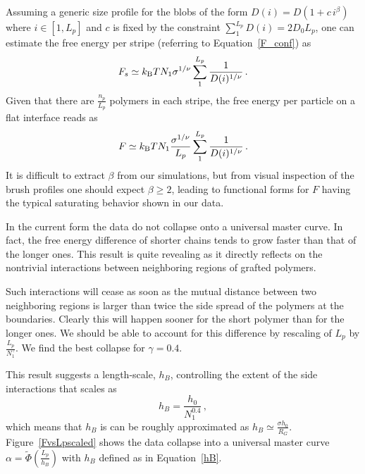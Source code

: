 Assuming a generic size profile for the blobs of the form $D(i)=D(1+ c \,i^{\beta})$ where $i\in [1,L_p]$ and
 $c$ is fixed by the constraint $\sum_1^{L_p} D(i)=2D_0L_p$, 
one can estimate the free energy per stripe (referring to Equation~\ref{F_conf}) as 
\begin{equation}
	F_s\simeq k_{\rm B}T N_1 \sigma^{1/\nu} \sum_1^{L_p}  \frac{1}{D(i)^{1/\nu}} \,.
\end{equation}
Given that there are $\frac{n_p}{L_p}$ polymers in each stripe, the free energy per particle on a flat interface  reads as
\begin{equation}
F\simeq k_{\rm B}T N_1 \frac{\sigma^{1/\nu}}{L_p} \sum_1^{L_p}  \frac{1}{D(i)^{1/\nu}} \,.
\end{equation}
It is difficult to extract $\beta$ from our simulations, but from visual inspection of the brush profiles 
one should  expect $\beta\geq2$, leading  to functional forms for $F$ having the typical saturating behavior 
shown in our data. 

In the current form the data do not  collapse onto a universal master curve. In fact, the free energy difference of shorter chains tends to grow faster than that of the longer ones. 
This result is quite revealing as it directly reflects on the 
nontrivial interactions between neighboring regions of grafted polymers.

Such interactions will cease as soon as the mutual distance between two neighboring regions is larger than
twice the side spread of the polymers at the boundaries. Clearly this will happen sooner for the 
short polymer than for the longer ones. We should be able to account for this difference by  
rescaling of $L_p$ by $\frac{L_p}{N_1^{\gamma}}$.
We find the best collapse for $\gamma=0.4$. 

This result suggests a 
length-scale, $h_B$, controlling the extent of the side interactions that scales as 
\begin{equation}
	h_B = \frac{h_0}{N_1^{0.4}} \,,
	\label{hB}
\end{equation}
which means that $h_B$ is can be roughly approximated as $h_B \simeq \frac{\sigma h_0}{R_G}$. 
Figure~\ref{FvsLpscaled} shows the data collapse into a universal master curve $\alpha={\tilde \Phi}\left(\frac{L_p}{h_B}\right)$ with $h_B$ defined as in Equation~\ref{hB}.

